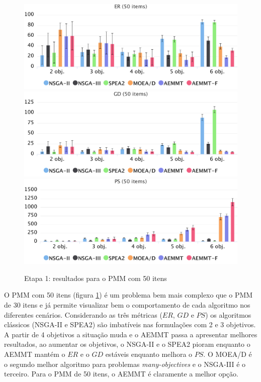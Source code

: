 \begin{figure}[!htbp]
	\caption{Etapa 1: resultados para o PMM com 50 itens}
	\label{fig_exp1_mkp_50}
	\includegraphics[width=1\textwidth]{cap_experimentos/figs/etapa1/er-mkp-50}
	\includegraphics[width=1\textwidth]{cap_experimentos/figs/etapa1/gd-mkp-50}
	\includegraphics[width=1\textwidth]{cap_experimentos/figs/etapa1/ps-mkp-50}
\end{figure}

O PMM com 50 itens (figura \ref{fig_exp1_mkp_50}) é um problema bem mais complexo que o PMM de 30 itens e já permite visualizar bem o comportamento de cada algoritmo nos diferentes cenários. Considerando as três métricas ($ER$, $GD$ e $PS$) os algoritmos clássicos (NSGA-II e SPEA2) são imbatíveis nas formulações com 2 e 3 objetivos. A partir de 4 objetivos a situação muda e o AEMMT passa a apresentar melhores resultados, ao aumentar os objetivos, o NSGA-II e o SPEA2 pioram enquanto o AEMMT mantém o $ER$ e o $GD$ estáveis enquanto melhora o $PS$. O MOEA/D é o segundo melhor algoritmo para problemas \textit{many-objectives} e o NSGA-III é o terceiro. Para o PMM de 50 itens, o AEMMT é claramente a melhor opção.

